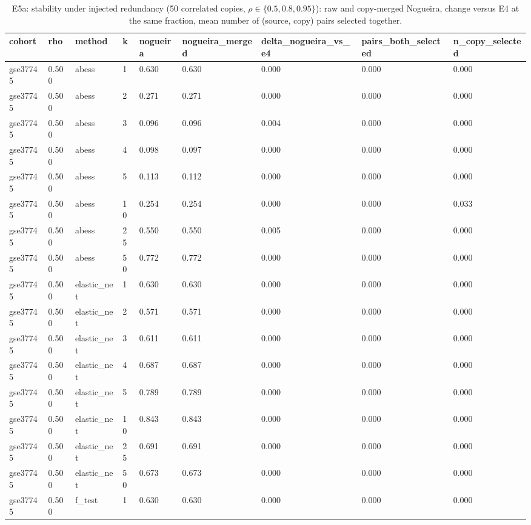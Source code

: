 \begin{table}[t]
  \centering
  \caption{E5a: stability under injected redundancy (50 correlated copies, $\rho \in \{0.5, 0.8, 0.95\}$): raw and copy-merged Nogueira, change versus E4 at the same fraction, mean number of (source, copy) pairs selected together.}
  \label{tab:e5a_redundancy}
  \small
  \begin{tabular}{lllllllll}
    \toprule
    cohort & rho & method & k & nogueira & nogueira\_merged & delta\_nogueira\_vs\_e4 & pairs\_both\_selected & n\_copy\_selected \\
    \midrule
    gse37745 & 0.500 & abess & 1 & 0.630 & 0.630 & 0.000 & 0.000 & 0.000 \\
    gse37745 & 0.500 & abess & 2 & 0.271 & 0.271 & 0.000 & 0.000 & 0.000 \\
    gse37745 & 0.500 & abess & 3 & 0.096 & 0.096 & 0.004 & 0.000 & 0.000 \\
    gse37745 & 0.500 & abess & 4 & 0.098 & 0.097 & 0.000 & 0.000 & 0.000 \\
    gse37745 & 0.500 & abess & 5 & 0.113 & 0.112 & 0.000 & 0.000 & 0.000 \\
    gse37745 & 0.500 & abess & 10 & 0.254 & 0.254 & 0.000 & 0.000 & 0.033 \\
    gse37745 & 0.500 & abess & 25 & 0.550 & 0.550 & 0.005 & 0.000 & 0.000 \\
    gse37745 & 0.500 & abess & 50 & 0.772 & 0.772 & 0.000 & 0.000 & 0.000 \\
    gse37745 & 0.500 & elastic\_net & 1 & 0.630 & 0.630 & 0.000 & 0.000 & 0.000 \\
    gse37745 & 0.500 & elastic\_net & 2 & 0.571 & 0.571 & 0.000 & 0.000 & 0.000 \\
    gse37745 & 0.500 & elastic\_net & 3 & 0.611 & 0.611 & 0.000 & 0.000 & 0.000 \\
    gse37745 & 0.500 & elastic\_net & 4 & 0.687 & 0.687 & 0.000 & 0.000 & 0.000 \\
    gse37745 & 0.500 & elastic\_net & 5 & 0.789 & 0.789 & 0.000 & 0.000 & 0.000 \\
    gse37745 & 0.500 & elastic\_net & 10 & 0.843 & 0.843 & 0.000 & 0.000 & 0.000 \\
    gse37745 & 0.500 & elastic\_net & 25 & 0.691 & 0.691 & 0.000 & 0.000 & 0.000 \\
    gse37745 & 0.500 & elastic\_net & 50 & 0.673 & 0.673 & 0.000 & 0.000 & 0.000 \\
    gse37745 & 0.500 & f\_test & 1 & 0.630 & 0.630 & 0.000 & 0.000 & 0.000 \\

\end{tabular}
\end{table}
